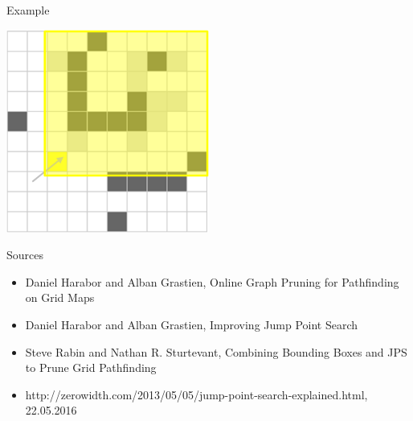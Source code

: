 \documentclass{presentation}
\begin{document}
\begin{frame}{Example}
    \begin{center}
        \includegraphics[width=0.5\textwidth]{figures/bounding_boxes2.png}
    \end{center}
\end{frame}



\begin{frame}
\end{frame}



\begin{frame}
\end{frame}


\begin{frame}{Sources}
	\begin{itemize}
		\item Daniel Harabor and Alban Grastien, Online Graph Pruning for Pathfinding on Grid Maps
		\item Daniel Harabor and Alban Grastien, Improving Jump Point Search
		\item Steve Rabin and Nathan R. Sturtevant, Combining Bounding Boxes and JPS to Prune Grid Pathfinding
		\item http://zerowidth.com/2013/05/05/jump-point-search-explained.html, 22.05.2016
	\end{itemize}
\end{frame}
\end{document}
